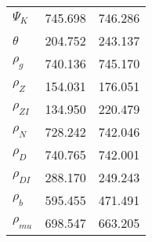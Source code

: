 \begin{center}
\begin{longtable}{lcc}
$ {\Psi_{K}}           $	 & 	     745.698	 & 	     746.286 \\ 
$ {\theta}             $	 & 	     204.752	 & 	     243.137 \\ 
$ {\rho_g}             $	 & 	     740.136	 & 	     745.170 \\ 
$ {\rho_Z}             $	 & 	     154.031	 & 	     176.051 \\ 
$ {\rho_{ZI}}          $	 & 	     134.950	 & 	     220.479 \\ 
$ {\rho_N}             $	 & 	     728.242	 & 	     742.046 \\ 
$ {\rho_D}             $	 & 	     740.765	 & 	     742.001 \\ 
$ {\rho_{DI}}          $	 & 	     288.170	 & 	     249.243 \\ 
$ {\rho_b}             $	 & 	     595.455	 & 	     471.491 \\ 
$ {\rho_{mu}}          $	 & 	     698.547	 & 	     663.205 \\ 
\end{longtable}
 \end{center}
